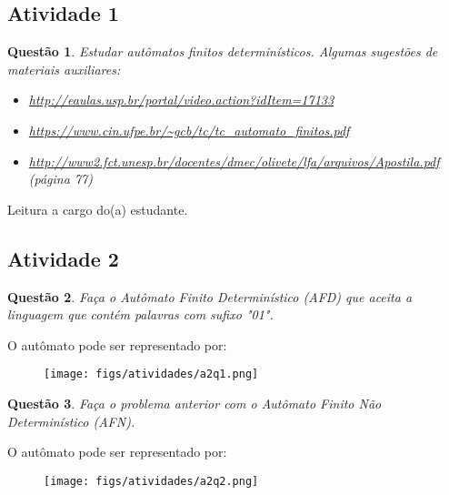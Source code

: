 \documentclass{article}
\newtheorem{problem}{Questão}
\begin{document}
\subsection{Atividade 1}
\begin{problem} Estudar autômatos finitos determinísticos.
Algumas sugestões de materiais auxiliares:
\begin{itemize}
    \item \url{http://eaulas.usp.br/portal/video.action?idItem=17133}
    \item \url{https://www.cin.ufpe.br/~gcb/tc/tc_automato_finitos.pdf}
    \item \url{http://www2.fct.unesp.br/docentes/dmec/olivete/lfa/arquivos/Apostila.pdf}  (página 77)
\end{itemize}

\end{problem}
\begin{solution} Leitura a cargo do(a) estudante.
\end{solution}

\subsection{Atividade 2}
\begin{problem} Faça o Autômato Finito Determinístico (AFD) que aceita a linguagem que contém palavras com sufixo "01".
\end{problem}

\begin{solution}
    O autômato pode ser representado por:

\begin{figure}[H]
        \centering
        \texttt{[image: figs/atividades/a2q1.png]}
\end{figure}
\end{solution}


\begin{problem}
     Faça o problema anterior com o Autômato Finito Não Determinístico (AFN).
\end{problem}

\begin{solution}
    O autômato pode ser representado por:

\begin{figure}[H]
        \centering
        \texttt{[image: figs/atividades/a2q2.png]}
\end{figure}
\end{solution}
\end{document}

